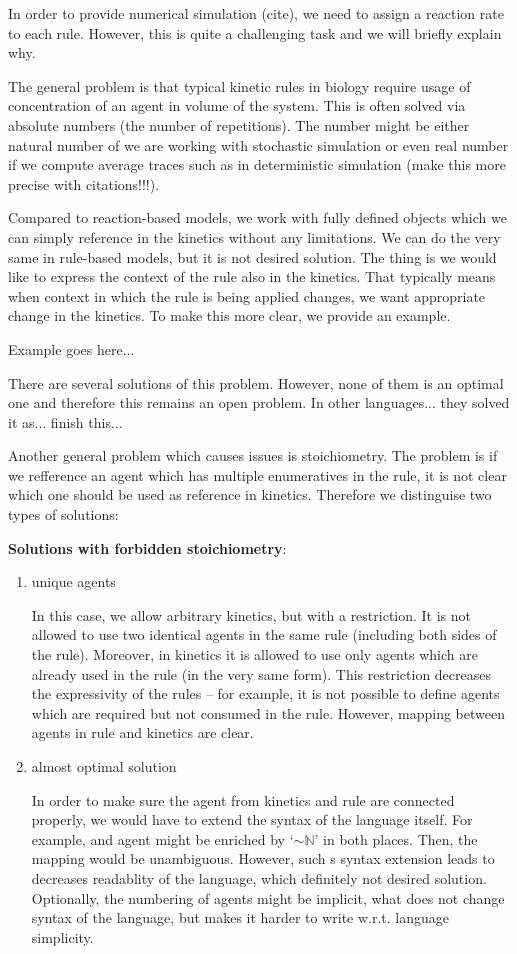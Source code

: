 \documentclass[12pt]{fithesis2}
\begin{document}
In order to provide numerical simulation (cite), we need to assign a reaction rate to each rule. However, this is quite a challenging task and we will briefly explain why.

The general problem is that typical kinetic rules in biology require usage of concentration of an agent in volume of the system. This is often solved via absolute numbers (the number of repetitions). The number might be either natural number of we are working with stochastic simulation or even real number if we compute average traces such as in deterministic simulation (make this more precise with citations!!!).

Compared to reaction-based models, we work with fully defined objects which we can simply reference in the kinetics without any limitations. We can do the very same in rule-based models, but it is not desired solution. The thing is we would like to express the context of the rule also in the kinetics. That typically means when context in which the rule is being applied changes, we want appropriate change in the kinetics. To make this more clear, we provide an example.

Example goes here...

There are several solutions of this problem. However, none of them is an optimal one and therefore this remains an open problem. In other languages... they solved it as... finish this...

Another general problem which causes issues is stoichiometry. The problem is if we refference an agent which has multiple enumeratives in the rule, it is not clear which one should be used as reference in kinetics. Therefore we distinguise two types of solutions:

\textbf{Solutions with forbidden stoichiometry}:

\begin{enumerate}
\item unique agents

In this case, we allow arbitrary kinetics, but with a restriction. It is not allowed to use two identical agents in the same rule (including both sides of the rule). Moreover, in kinetics it is allowed to use only agents which are already used in the rule (in the very same form). This restriction decreases the expressivity of the rules -- for example, it is not possible to define agents which are required but not consumed in the rule. However, mapping between agents in rule and kinetics are clear.

\item almost optimal solution

In order to make sure the agent from kinetics and rule are connected properly, we would have to extend the syntax of the language itself. For example, and agent might be enriched by `$\sim\mathbb{N}$' in both places. Then, the mapping would be unambiguous. However, such s syntax extension leads to decreases readablity of the language, which definitely not desired solution. Optionally, the numbering of agents might be implicit, what does not change syntax of the language, but makes it harder to write w.r.t. language simplicity.

\end{enumerate}
\end{document}
